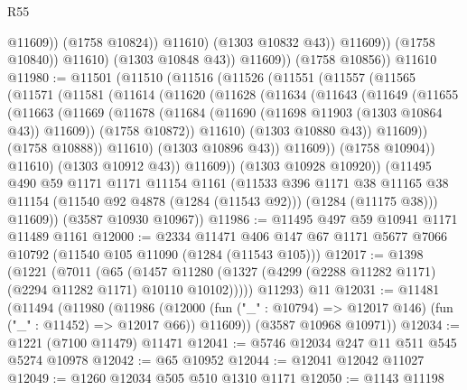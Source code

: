 \begin{lexlean}{R55}
\begin{coremodule}
                              @11609))
                          (@1758 @10824))
                        @11610)
                      (@1303 @10832 @43))
                    @11609))
                (@1758 @10840))
              @11610)
            (@1303 @10848 @43))
          @11609))
      (@1758 @10856))
    @11610
@11980 := @11501
    (@11510
      (@11516
        (@11526
          (@11551
            (@11557
              (@11565
                (@11571
                  (@11581
                    (@11614
                      (@11620
                        (@11628
                          (@11634
                            (@11643
                              (@11649
                                (@11655
                                  (@11663
                                    (@11669
                                      (@11678
                                        (@11684 (@11690 (@11698 @11903 (@1303 @10864 @43)) @11609))
                                        (@1758 @10872))
                                      @11610)
                                    (@1303 @10880 @43))
                                  @11609))
                              (@1758 @10888))
                            @11610)
                          (@1303 @10896 @43))
                        @11609))
                    (@1758 @10904))
                  @11610)
                (@1303 @10912 @43))
              @11609))
          (@1303 @10928 @10920))
        (@11495
          @490
          @59
          @1171
          @1171
          @11154
          @1161
          (@11533
            @396
            @1171
            @38
            @11165
            @38
            @11154
            (@11540 @92 @4878 (@1284 (@11543 @92)))
            (@1284 (@11175 @38)))
          @11609))
      (@3587 @10930 @10967))
@11986 := @11495 @497 @59 @10941 @1171 @11489 @1161
@12000 := @2334
    @11471
    @406
    @147
    @67
    @1171
    @5677
    @7066
    @10792
    (@11540 @105 @11090 (@1284 (@11543 @105)))
@12017 := @1398
    (@1221
      (@7011
        (@65
          (@1457 @11280 (@1327 (@4299 (@2288 @11282 @1171) (@2294 @11282 @1171) @10110 @10102)))))
      @11293)
    @11
@12031 := @11481
    (@11494
      (@11980
        (@11986
          (@12000 (fun ("_" : @10794) => @12017 @146) (fun ("_" : @11452) => @12017 @66))
          @11609))
      (@3587 @10968 @10971))
@12034 := @1221 (@7100 @11479) @11471
@12041 := @5746 @12034 @247 @11 @511 @545 @5274 @10978
@12042 := @65 @10952
@12044 := @12041 @12042 @11027
@12049 := @1260 @12034 @505 @510 @1310 @1171
@12050 := @1143 @11198

\end{coremodule}
\end{lexlean}
